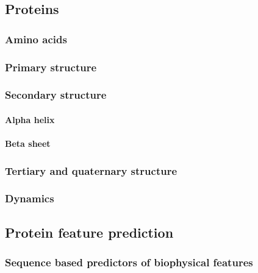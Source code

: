 \documentclass[a4paper]{article}
\begin{document}
	\subsection{Proteins}
		
		\subsubsection{Amino acids}
			
		\subsubsection{Primary structure}
			
		\subsubsection{Secondary structure}
			
			\paragraph{Alpha helix}
				
			\paragraph{Beta sheet}
				
		\subsubsection{Tertiary and quaternary structure}
				
		\subsubsection{Dynamics}
			

			
	\subsection{Protein feature prediction}
		
		\subsubsection{Sequence based predictors of biophysical features}
			
\end{document}
